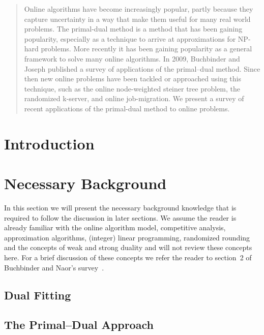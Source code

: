 \documentclass[10pt, twocolumn]{article}
\begin{document}
\maketitle

\begin{abstract}
Online algorithms have become increasingly popular, partly because they capture uncertainty in a way that make them useful for many real world problems. The primal-dual method is a method that has been gaining popularity, especially as a technique to arrive at approximations for NP-hard problems.  More recently it has been gaining popularity as a general framework to solve many online algorithms. In 2009, Buchbinder and Joseph published a survey of applications of the primal--dual method. Since then new online problems have been tackled or approached using this technique, such as the online node-weighted steiner tree problem, the randomized k-server, and online job-migration. We present a survey of recent applications of the primal-dual method to online problems.
\end{abstract}

\section{Introduction}

\section{Necessary Background}

In this section we will present the necessary background knowledge that is required to follow the discussion in later sections. We assume the reader is already familiar with the online algorithm model, competitive analysis, approximation algorithms, (integer) linear programming, randomized rounding and the concepts of weak and strong duality and will not review these concepts here. For a brief discussion of these concepts we refer the reader to section~2 of Buchbinder and Naor's survey~\cite{buchbinder09:survey}.

\subsection{Dual Fitting}

\subsection{The Primal--Dual Approach}
\end{document}

